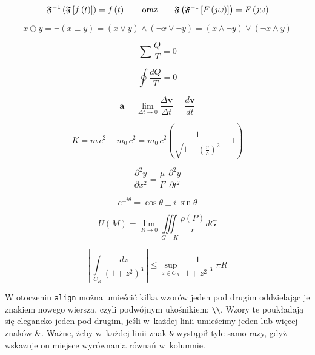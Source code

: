 \[
\mathfrak{F}^{-1}\left(\mathfrak{F} \left[ f\left(t \right ) \right ] \right ) = f \left(t \right )
\qquad \textup{oraz} \qquad
\mathfrak{F}\left(\mathfrak{F}^{-1} \left[ F\left(j\omega \right ) \right ] \right ) = F \left(j\omega \right )
\]

\begin{equation*}
    x \oplus y = \neg (x \equiv y) = (x \vee y) \wedge (\neg x \vee \neg y) = (x \wedge \neg y) \vee (\neg x \wedge y)
\end{equation*}

\begin{equation*}
    \sum \frac{Q}{T} = 0
\end{equation*}

\begin{equation}
    \oint \frac{dQ}{T} = 0
\end{equation}

\begin{equation}
    \pmb{a} = \lim\limits_{\Delta t \to 0} \frac{\Delta \pmb{v}}{\Delta t} = \frac{d\pmb{v}}{dt}
\end{equation}

\begin{equation}
K = m\,c^2 - m_0\,c^2 
 = m_0\,c^2 \left(
  \frac{1}{ \sqrt{1 - \left( \frac{v}{c} \right)^2 } } -1 
 \right)
\end{equation}

\begin{equation}
    \frac{\partial^2 y}{\partial x^2} = \frac{\mu}{F} \; \frac{\partial^2 y}{\partial t^2}
\end{equation}

\begin{equation}
    e^{\pm i\theta} = \cos \theta \pm i~\sin\theta
\end{equation}

\begin{equation}
    U(M) = \lim\limits_{R\to 0} \iiint\limits_{G-K}\frac{\rho(P)}{r}dG
\end{equation}

\begin{equation*}
    \left| \, \int\limits_{C_R} \frac{dz}{\left( 1+z^2 \right )^3} \, \right| \leqslant \sup\limits_{z \in C_R} \frac{1}{\left| 1+z^2 \right|^3} \; \pi R
\end{equation*}

W otoczeniu \texttt{align} można umieścić kilka wzorów jeden pod drugim oddzielając je znakiem nowego wiersza, czyli podwójnym ukośnikiem: \texttt{\textbackslash{}\textbackslash{}}. Wzory te poukładają się elegancko jeden pod drugim, jeśli w~każdej linii umieścimy jeden lub więcej znaków \&. Ważne, żeby w~każdej linii znak \texttt{\&} wystąpił tyle samo razy, gdyż wskazuje on miejsce wyrównania równań w~kolumnie.

